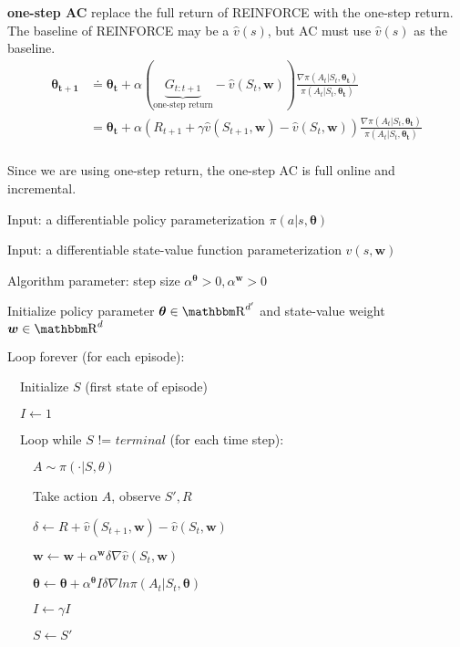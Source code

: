 \documentclass[sutton_barto_notes.tex]{subfiles}
\begin{document}
\begin{definition}
\textbf{one-step AC} replace the full return of REINFORCE with the one-step return. The baseline of REINFORCE may be a $\hat{v}(s)$, but AC must use $\hat{v}(s)$ as the baseline.
\begin{align*}
\bm{\theta_{t+1}} &\doteq \bm{\theta_t} + \alpha (\underbrace{G_{t:t+1}}_{\text{one-step return}} - \hat{v}(S_t, \bm{w})) \frac{\nabla\pi(A_t|S_t,\bm{\theta_t})}{\pi(A_t|S_t,\bm{\theta_t})} \\
&= \bm{\theta_t} + \alpha (R_{t+1} + \gamma\hat{v}(S_{t+1},\bm{w}) - \hat{v}(S_t, \bm{w})) \frac{\nabla\pi(A_t|S_t,\bm{\theta_t})}{\pi(A_t|S_t,\bm{\theta_t})} \\
\end{align*}
\end{definition}

Since we are using one-step return, the one-step AC is full online and incremental.

\begin{tcolorbox}[width=1.1\textwidth,title={One-step Actor-Critic (episodic), for estimating $\pi_\theta\approx\pi_*$}]
Input: a differentiable policy parameterization $\pi(a|s,\bm{\theta})$

Input: a differentiable state-value function parameterization $\hat{v}(s,\bm{w})$

Algorithm parameter: step size $\alpha^{\bm{\theta}} > 0, \alpha^{\bm{w}} > 0$

Initialize policy parameter $\bm{\theta} \in \R^{d'}$ and state-value weight $\bm{w} \in \R^d$

Loop forever (for each episode):

$\quad$Initialize $S$ (first state of episode)

$\quad I \leftarrow 1$

$\quad$Loop while $S$ != $terminal$ (for each time step):

$\quad\quad A \sim \pi(\cdot | S, \theta)$

$\quad\quad$Take action $A$, observe $S', R$

$\quad\quad \delta\leftarrow R + \hat{v}(S_{t+1},\bm{w}) - \hat{v}(S_t, \bm{w})$

$\quad\quad \bm{w} \leftarrow \bm{w} + \alpha^{\bm{w}}\delta\nabla\hat{v}(S_t,\bm{w})$

$\quad\quad\bm{\theta}\leftarrow\bm{\theta}+\alpha^{\bm{\theta}} I \delta \nabla ln\pi(A_t | S_t, \bm{\theta})$

$\quad\quad I \leftarrow \gamma I$

$\quad\quad S \leftarrow S'$
\end{tcolorbox}
\end{document}
